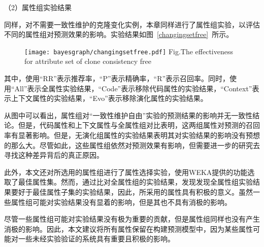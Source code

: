（2）属性组实验结果

同样，对不需要一致性维护的克隆变化实例，本章同样进行了属性组实验，以评估不同的属性组对预测效果的影响。实验结果如图~\ref{changingsetfree}~所示。

\begin{figure}[htbp]
\centering
\texttt{[image: bayesgraph/changingsetfree.pdf]}
{Fig.$\!$}{The effectiveness for attribute set of clone consistency free}
\vspace{-1em}
\end{figure}

其中，使用“RR”表示推荐率，“P”表示精确率，“R”表示召回率。同时，使用“All”表示全属性实验结果，“Code”表示移除代码属性的实验结果，“Context”表示上下文属性的实验结果，“Evo”表示移除演化属性的实验结果。

从图中可以看出，属性组对“一致性维护自由”实验的预测结果的影响并无一致性结论。但是，代码属性和上下文属性与全属性组对比表明，这两组属性对预测的召回率有显著影响。但是，无演化组属性的实验结果表明其对实验结果的影响没有预想的那么大。尽管如此，这些属性组依然对预测效果有影响，但需要进一步的研究去寻找这种差异背后的真正原因。

此外，本文还对所选用的属性组进行了属性选择实验，使用WEKA提供的功能选取了最佳属性集。然而，通过比对全属性组的实验结果，发现发现全属性组实验结果要好于最佳属性子集的实验结果，因此，所采用的属性具有积极的意义。虽然一些属性组可能对实验结果没有显着的影响，但是其也不具有消极的影响。

尽管一些属性组可能对实验结果没有极为重要的贡献，但是属性组同样也没有产生消极的影响。因此，本文建议将所有属性保留在构建预测模型中，因为某些属性可能对一些未经实验验证的系统具有重要且积极的影响。


